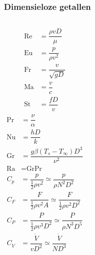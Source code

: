 \documentclass[t]{beamer}
\begin{document}
	\begin{frame}
		\frametitle{Dimensieloze getallen}
		\noindent
		\begin{columns}[t,onlytextwidth]
			\begin{align*}
				\text{Re} &= \dfrac{\rho v D}{\mu} \\
				\text{Eu} &= \dfrac{p}{\rho v^2} \\
				\text{Fr} &= \dfrac{v}{\sqrt{g D}} \\
				\text{Ma} &= \dfrac{v}{c} \\
				\text{St} &= \dfrac{f D}{v}
			\end{align*}
			\pause
			\begin{align*}
				\text{Pr} &= \dfrac{\nu}{\alpha} \\
				\text{Nu} &= \dfrac{h D}{k} \\
				\text{Gr} &= \dfrac{g \beta (T_s-T_{\infty}) D^3}{\nu^2} \\
				\text{Ra} &= \text{Gr} \text{Pr}
			\end{align*}
			\pause
			\begin{align*}
				C_p &= \dfrac{p}{\frac{1}{2} \rho v^2} \simeq \dfrac{p}{\rho N^2 D^2} \\
				C_F &= \dfrac{F}{\frac{1}{2} \rho v^2 A} \simeq \dfrac{F}{\frac{1}{2} \rho v^2 D^2} \\
				C_P &= \dfrac{P}{\frac{1}{2} \rho v^3 D^2} \simeq \dfrac{P}{\rho N^3 D^5} \\
				C_{\dot{V}} &= \dfrac{\dot{V}}{v D^2} \simeq \dfrac{\dot{V}}{N D^3}
			\end{align*}
		\end{columns}
	\end{frame}
\end{document}
